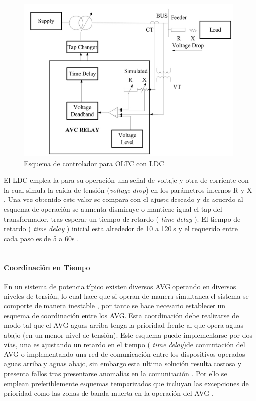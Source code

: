 \documentclass[12pt, letterpaper]{report}
\begin{document}
\begin{figure}[h]
\centering
\caption{Esquema de controlador para OLTC con LDC \cite{Sarimuthu2016}}
\label{fig:esqusema_LDC}
\includegraphics[width=0.7\linewidth]{imagenes/cap_2/LDC}
\end{figure}
El LDC emplea la para su operación una señal de voltaje  y otra de corriente con la cual  simula la caída de tensión (\textit{voltage drop})  en los parámetros internos R  y X \cite{Sarimuthu2016}. Una vez obtenido este valor  se compara con el ajuste deseado y de acuerdo al esquema de operación se aumenta disminuye o mantiene igual el tap del  transformador, tras esperar un tiempo de retardo ( \textit{time delay} ). El tiempo de retardo ( \textit{time delay} ) inicial esta alrededor de 10  a 120 s y el requerido entre cada paso  es de 5 a 60s  \cite{Sarimuthu2016}.\\\\

\paragraph{Coordinación en Tiempo}
En un sistema de potencia típico existen diversos AVG operando  en diversos niveles de tensión, lo cual hace que si operan de manera simultanea el sistema se comporte de manera inestable \cite{Sarimuthu2016}, por tanto  se hace necesario  establecer un esquema de coordinación entre los AVG. Esta coordinación debe realizarse de modo tal que el AVG aguas arriba tenga la prioridad  frente al que opera aguas abajo (en un menor nivel de tensión).
Este esquema puede implementarse por dos vías, una es ajustando  un retardo en el tiempo ( \textit{time delay})de conmutación del AVG o implementando una red de comunicación entre los dispositivos operados aguas arriba y aguas abajo, sin embargo esta ultima solución resulta costosa y presenta fallos tras presentarse anomalías en la comunicación \cite{Sarimuthu2016}. Por ello se emplean preferiblemente esquemas temporizados que incluyan las excepciones  de prioridad como las zonas de banda muerta en la operación del AVG \cite{Sarimuthu2016}.\\\\
\end{document}
